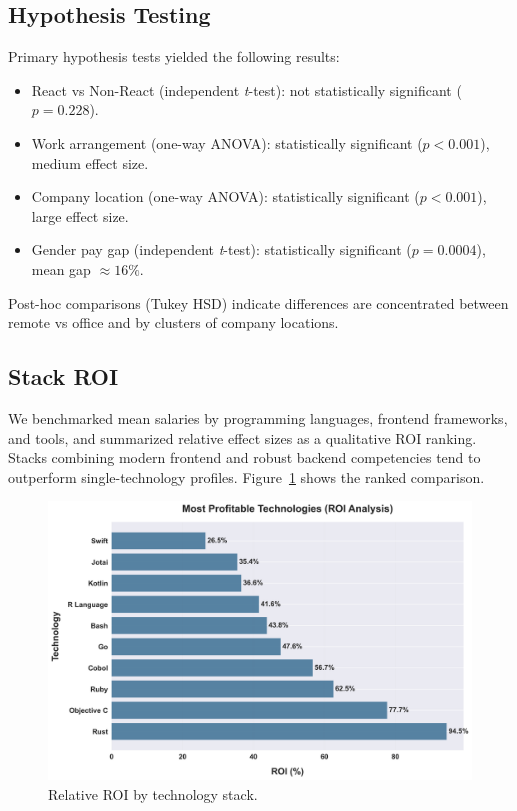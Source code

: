 \subsection{Hypothesis Testing}
Primary hypothesis tests yielded the following results:
\begin{itemize}[leftmargin=*]
  \item React vs Non-React (independent \textit{t}-test): not statistically significant ($p = 0.228$).
  \item Work arrangement (one-way ANOVA): statistically significant ($p < 0.001$), medium effect size.
  \item Company location (one-way ANOVA): statistically significant ($p < 0.001$), large effect size.
  \item Gender pay gap (independent \textit{t}-test): statistically significant ($p = 0.0004$), mean gap $\approx 16\%$.
\end{itemize}

Post-hoc comparisons (Tukey HSD) indicate differences are concentrated between remote vs office and by clusters of company locations.

\subsection{Stack ROI}
We benchmarked mean salaries by programming languages, frontend frameworks, and tools, and summarized relative effect sizes as a qualitative ROI ranking. Stacks combining modern frontend and robust backend competencies tend to outperform single-technology profiles. Figure~\ref{fig:stack-roi} shows the ranked comparison.

\begin{figure}[H]
  \centering
  \includegraphics[width=0.85\linewidth]{figures/12_en_karli_teknolojiler.png}
  \caption{Relative ROI by technology stack.}
  \label{fig:stack-roi}
\end{figure}


